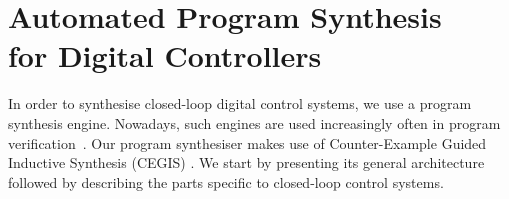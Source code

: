 \documentclass{sig-alternate-05-2015}
\newcommand{\red}[1]{{\color{red}#1}}
\begin{document}
%
%
%




\section{Automated Program Synthesis \\ for Digital Controllers}


In order to synthesise closed-loop digital control systems, we use a
program synthesis engine.  Nowadays, such engines are used
increasingly often in program
verification~\cite{DBLP:conf/lpar/DavidKL15,DBLP:conf/cav/0001A14}.
Our program synthesiser makes use of Counter-Example Guided Inductive
Synthesis (CEGIS) \cite{sketch}.  We start by presenting its general
architecture followed by describing the parts specific to closed-loop
control systems.
\end{document}
